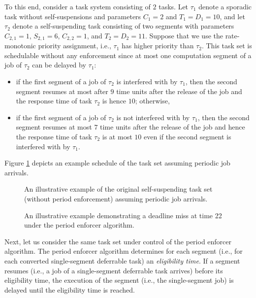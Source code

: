To this end, consider a task system consisting of $2$ tasks. Let $\tau_1$ denote a sporadic task without self-suspensions and parameters $C_1 = 2$ and $T_1=D_1=10$, and let $\tau_2$ denote a self-suspending task consisting of two segments with parameters  $C_{2,1} = 1$,  $S_{2,1} = 6$, $C_{2,2}=1$, and $ T_2=D_2=11$. Suppose that we use the rate-monotonic priority assignment, i.e., $\tau_1$ has higher priority than $\tau_2$. This task set is schedulable without any enforcement since at most one computation segment of a job of $\tau_2$ can be delayed by $\tau_1$: 
\begin{itemize}
	\item if the first segment of a job of $\tau_2$ is interfered with by $\tau_1$, then the second segment resumes at most after $9$ time units after the release of the job and the response time of task $\tau_2$ is hence $10$; otherwise,
	\item  if the first segment of a job of $\tau_2$ is not interfered with by $\tau_1$, then the second segment resumes at most $7$ time units after the release of the job and hence the  response time of task $\tau_2$ is at most $10$ even if the second segment is interfered with by $\tau_1$.
\end{itemize}
Figure \ref{fig:example-original} depicts an example schedule of the task set assuming periodic job arrivals.


\ifpaper
\begin{figure}[t]
  \centering
  
  \caption{An illustrative example of the original self-suspending task set (without period enforcement) assuming periodic job arrivals.}
  \label{fig:example-original}
  \end{figure}
\begin{figure}[t]
  \centering
  
  \caption{An illustrative example demonstrating a deadline miss at time 22
    under the period enforcer algorithm.}
\label{fig:example}  
\end{figure}
\fi

Next, let us consider the same task set under control of the period enforcer algorithm.
The period enforcer algorithm determines for each segment (i.e., for each converted single-segment deferrable task) an \emph{eligibility time}. If a segment resumes (i.e., a job of a single-segment deferrable task arrives) before its eligibility time, the execution of the segment (i.e., the single-segment job) is delayed until the eligibility time is reached.

